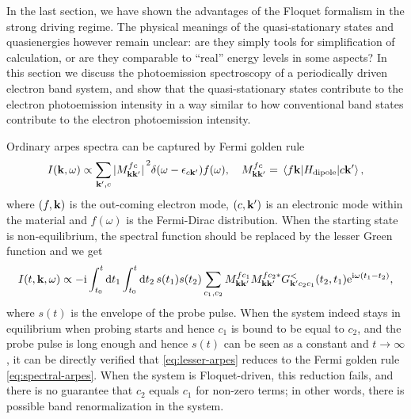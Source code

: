 \documentclass[hyperref, a4paper]{article}
\newcommand*{\ii}{\mathrm{i}}
\newcommand*{\ee}{\mathrm{e}}
\begin{document}
In the last section, we have shown the advantages of the Floquet formalism 
in the strong driving regime.
The physical meanings of the quasi-stationary states and quasienergies however remain unclear:
are they simply tools for simplification of calculation, 
or are they comparable to ``real'' energy levels in some aspects?
In this section we discuss the photoemission spectroscopy of a periodically driven electron band system, 
and show that the quasi-stationary states contribute to the 
electron photoemission intensity in a way similar to 
how conventional band states contribute to the electron photoemission intensity.

Ordinary \ac{arpes} spectra can be captured by Fermi golden rule \cite{sobota2021angle}
\begin{equation}
    I(\vb{k}, \omega) \propto \sum_{\vb{k}', c} 
    \abs*{M_{\vb{k} \vb{k}'}^{fc}}^2 \delta(\omega - \epsilon_{c \vb{k}'}) f(\omega),
    \quad M^{fc}_{\vb{k} \vb{k}'} = \mel{f \vb{k}}{H_{\text{dipole}}}{c \vb{k}'},
    \label{eq:spectral-arpes}
\end{equation}
where $(f, \vb{k})$ is the out-coming electron mode, 
$(c, \vb{k}')$ is an electronic mode within the material 
and $f(\omega)$ is the Fermi-Dirac distribution.
When the starting state is non-equilibrium, 
the spectral function should be replaced by the lesser Green function 
and we get \cite{freericks2009theoretical,rustagi2018photoemission,schuler2021theory,chan2023giant} 
\begin{equation}
    I(t, \vb{k}, \omega) \propto - \ii \int_{t_0}^t \dd{t_1} \int_{t_0}^t \dd{t_2} s(t_1) s(t_2) 
    \sum_{c_1, c_2}
    M_{\vb{k} \vb{k}'}^{fc_1} M_{\vb{k} \vb{k}'}^{fc_2 *} 
    G^<_{\vb{k}' c_2 c_1}(t_2, t_1) \ee^{\ii \omega (t_1 - t_2)} ,
    \label{eq:lesser-arpes}
\end{equation}
where $s(t)$ is the envelope of the probe pulse.
When the system indeed stays in equilibrium when probing starts
and hence $c_1$ is bound to be equal to $c_2$, 
and the probe pulse is long enough and 
hence $s(t)$ can be seen as a constant and $t \to \infty$, 
it can be directly verified that \eqref{eq:lesser-arpes} 
reduces to the Fermi golden rule \eqref{eq:spectral-arpes}.
When the system is Floquet-driven, this reduction fails, 
and there is no guarantee that $c_2$ equals $c_1$ for non-zero terms;
in other words, there is possible band renormalization in the system.
\end{document}
